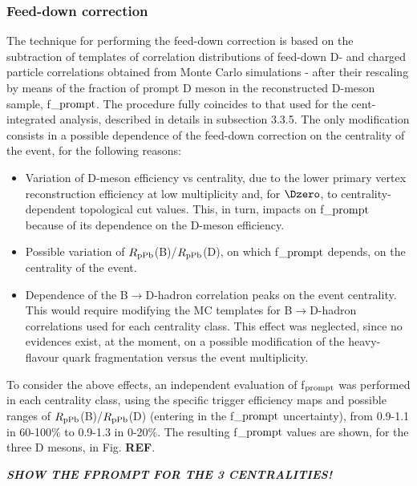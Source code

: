 \subsubsection{Feed-down correction}
The technique for performing the feed-down correction is based on the subtraction of templates of correlation distributions of feed-down D- and charged particle correlations obtained from Monte Carlo simulations - after their rescaling by means of the fraction of prompt D meson in the reconstructed D-meson sample, f$\_{\rm prompt}$.
The procedure fully coincides to that used for the cent-integrated analysis, described in details in subsection 3.3.5.
The only modification consists in a possible dependence of the feed-down correction on the centrality of the event, for the following reasons:
\begin{itemize}
  \item Variation of D-meson efficiency vs centrality, due to the lower primary vertex reconstruction efficiency at low multiplicity and, for $\Dzero$, to centrality-dependent topological cut values. This, in turn, impacts on f$\_{\rm prompt}$ because of its dependence on the D-meson efficiency.
  \item Possible variation of $R_{\rm pPb}$(B)/$R_{\rm pPb}$(D), on which f$\_{\rm prompt}$ depends, on the centrality of the event.
  \item Dependence of the B$\rightarrow$D-hadron correlation peaks on the event centrality. This would require modifying the MC templates for B$\rightarrow$D-hadron correlations used for each centrality class. This effect was neglected, since no evidences exist, at the moment, on a possible modification of the heavy-flavour quark fragmentation versus the event multiplicity.
\end{itemize}
To consider the above effects, an independent evaluation of f$_{\rm prompt}$ was performed in each centrality class, using the specific trigger efficiency maps and possible ranges of $R_{\rm pPb}$(B)/$R_{\rm pPb}$(D) (entering in the f$\_{\rm prompt}$ uncertainty), from 0.9-1.1 in 60-100\% to 0.9-1.3 in 0-20\%.
The resulting f$\_{\rm prompt}$ values are shown, for the three D mesons, in Fig. {\bf REF}.

\textit{\textbf{SHOW THE FPROMPT FOR THE 3 CENTRALITIES!}} 